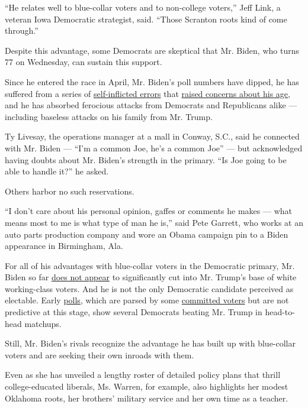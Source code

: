 ``He relates well to blue-collar voters and to non-college voters,''
Jeff Link, a veteran Iowa Democratic strategist, said. ``Those Scranton
roots kind of come through.''

Despite this advantage, some Democrats are skeptical that Mr. Biden, who
turns 77 on Wednesday, can sustain this support.

Since he entered the race in April, Mr. Biden's poll numbers have
dipped, he has suffered from a series of
\href{https://www.nytimes.com/2019/08/12/us/politics/joe-biden-gaffes.html}{self-inflicted
errors} that
\href{https://www.nytimes.com/2019/07/29/us/politics/joe-biden-age.html}{raised
concerns about his age}, and he has absorbed ferocious attacks from
Democrats and Republicans alike --- including baseless attacks on his
family from Mr. Trump.

Ty Livesay, the operations manager at a mall in Conway, S.C., said he
connected with Mr. Biden --- ``I'm a common Joe, he's a common Joe'' ---
but acknowledged having doubts about Mr. Biden's strength in the
primary. ``Is Joe going to be able to handle it?'' he asked.

Others harbor no such reservations.

``I don't care about his personal opinion, gaffes or comments he makes
--- what means most to me is what type of man he is,'' said Pete
Garrett, who works at an auto parts production company and wore an Obama
campaign pin to a Biden appearance in Birmingham, Ala.

For all of his advantages with blue-collar voters in the Democratic
primary, Mr. Biden so far
\href{https://www.nytimes.com/2019/11/12/upshot/democratic-polls-battleground-states.html}{does
not appear} to significantly cut into Mr. Trump's base of white
working-class voters. And he is not the only Democratic candidate
perceived as electable. Early
\href{https://www.realclearpolitics.com/epolls/latest_polls/general_election/}{polls,}
which are parsed by some
\href{https://www.nytimes.com/2019/08/22/us/politics/joe-biden-trump-2020.html}{committed
voters} but are not predictive at this stage, show several Democrats
beating Mr. Trump in head-to-head matchups.

Still, Mr. Biden's rivals recognize the advantage he has built up with
blue-collar voters and are seeking their own inroads with them.

Even as she has unveiled a lengthy roster of detailed policy plans that
thrill college-educated liberals, Ms. Warren, for example, also
highlights her modest Oklahoma roots, her brothers' military service and
her own time as a teacher.

